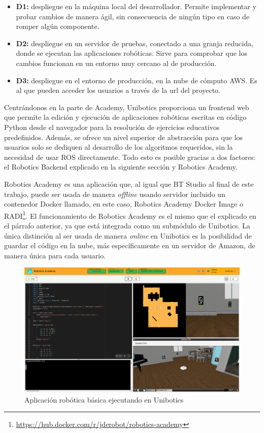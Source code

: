 \begin{itemize}
    \item \textbf{D1:} despliegue en la máquina local del desarrollador. Permite implementar y probar cambios de manera ágil, sin consecuencia de ningún tipo en caso de romper algún componente. 
    \item \textbf{D2:} despliegue en un servidor de pruebas, conectado a una granja reducida, donde se ejecutan las aplicaciones robóticas. Sirve para comprobar que los cambios funcionan en un entorno muy cercano al de producción.
    \item \textbf{D3:} despliegue en el entorno de producción, en la nube de cómputo AWS. Es al que pueden acceder los usuarios a través de la url del proyecto. 
\end{itemize}

Centrándonos en la parte de Academy, Unibotics proporciona un frontend web que permite la edición y ejecución de aplicaciones robóticas escritas en código Python desde el navegador para la resolución de ejercicios educativos predefinidos. Además, se ofrece un nivel superior de abstracción para que los usuarios solo se dediquen al desarrollo de los algoritmos requeridos, sin la necesidad de usar ROS directamente. Todo esto es posible gracias a dos factores: el Robotics Backend explicado en la siguiente sección y Robotics Academy.

Robotics Academy\cite{app10217419} es una aplicación que, al igual que BT Studio al final de este trabajo, puede ser usada de manera \textit{offline} usando servidor incluido un contenedor Docker llamado, en este caso, Robotics Academy Docker Image o RADI\footnote{\url{https://hub.docker.com/r/jderobot/robotics-academy}}. El funcionamiento de Robotics Academy es el mismo que el explicado en el párrafo anterior, ya que está integrada como un submódulo de Unibotics. La única distinción al ser usada de manera \textit{online} en Unibotics es la posibilidad de guardar el código en la nube, más específicamente en un servidor de Amazon, de manera única para cada usuario.

\begin{figure}[H]
    \centering
    \includegraphics[width=1.0\textwidth]{figures/fundamentos/unib-demo.png}
    \caption{Aplicación robótica básica ejecutando en Unibotics}
    \label{fig:ejemplo}
\end{figure}

